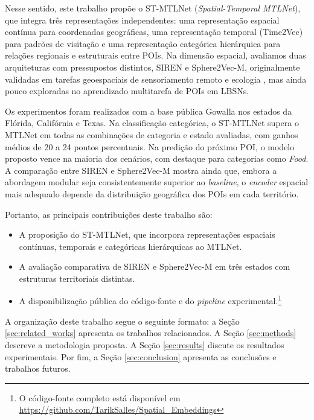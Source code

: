 Nesse sentido, este trabalho propõe o ST-MTLNet (\textit{Spatial-Temporal MTLNet}), que integra três representações independentes: uma representação espacial contínua para coordenadas geográficas, uma representação temporal (Time2Vec) para padrões de visitação e uma representação categórica hierárquica para relações regionais e estruturais entre POIs. Na dimensão espacial, avaliamos duas arquiteturas com pressupostos distintos, SIREN e Sphere2Vec-M, originalmente validadas em tarefas geoespaciais de sensoriamento remoto e ecologia \cite{wu2024torchspatial}, mas ainda pouco exploradas no aprendizado multitarefa de POIs em LBSNs.

Os experimentos foram realizados com a base pública Gowalla \cite{jure2014snap} nos estados da Flórida, Califórnia e Texas. Na classificação categórica, o ST-MTLNet supera o MTLNet em todas as combinações de categoria e estado avaliadas, com ganhos médios de 20 a 24 pontos percentuais. Na predição do próximo POI, o modelo proposto vence na maioria dos cenários, com destaque para categorias como \textit{Food}. A comparação entre SIREN e Sphere2Vec-M mostra ainda que, embora a abordagem modular seja consistentemente superior ao \textit{baseline}, o \textit{encoder} espacial mais adequado depende da distribuição geográfica dos POIs em cada território.

Portanto, as principais contribuições deste trabalho são:
\begin{itemize}
\item A proposição do ST-MTLNet, que incorpora representações espaciais contínuas, temporais e categóricas hierárquicas ao MTLNet.

\item A avaliação comparativa de SIREN e Sphere2Vec-M em três estados com estruturas territoriais distintas.

\item A disponibilização pública do código-fonte e do \textit{pipeline} experimental.\footnote{O código-fonte completo está disponível em \url{https://github.com/TarikSalles/Spatial_Embeddings}}
\end{itemize}

A organização deste trabalho segue o seguinte formato: a Seção \ref{sec:related_works} apresenta os trabalhos relacionados. A Seção \ref{sec:methods} descreve a metodologia proposta. A Seção \ref{sec:results} discute os resultados experimentais. Por fim, a Seção \ref{sec:conclusion} apresenta as conclusões e trabalhos futuros.
